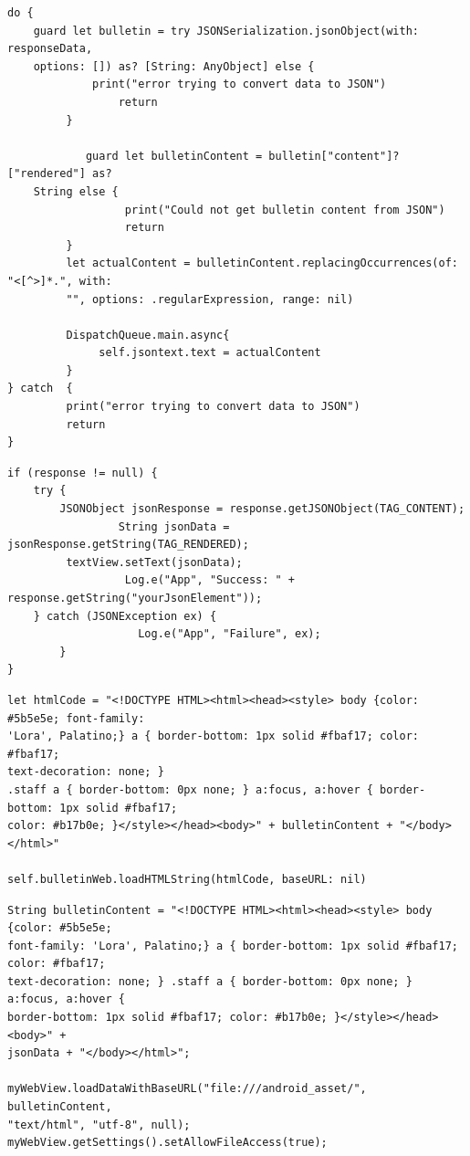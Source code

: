 \documentclass[letterpaper,10pt,draftclsnofoot,onecolumn,titlepage]{IEEEtran}
\begin{document}
\begin{lstlisting}[caption=iOS JSON Parser]
 do {
 	guard let bulletin = try JSONSerialization.jsonObject(with: responseData,
	options: []) as? [String: AnyObject] else {
	         print("error trying to convert data to JSON")
                 return
         }

        	guard let bulletinContent = bulletin["content"]?["rendered"] as?
	String else {
                  print("Could not get bulletin content from JSON")
                  return
         }
         let actualContent = bulletinContent.replacingOccurrences(of: "<[^>]*.", with:
         "", options: .regularExpression, range: nil)

         DispatchQueue.main.async{
 	          self.jsontext.text = actualContent
         }
} catch  {
         print("error trying to convert data to JSON")
         return
}
\end{lstlisting}

\begin{lstlisting}[caption=Android JSON Parser]
if (response != null) {
	try {
		JSONObject jsonResponse = response.getJSONObject(TAG_CONTENT);
                 String jsonData = jsonResponse.getString(TAG_RENDERED);
		 textView.setText(jsonData);
                  Log.e("App", "Success: " + response.getString("yourJsonElement"));
	} catch (JSONException ex) {
                    Log.e("App", "Failure", ex);
        }
}
\end{lstlisting}

\begin{lstlisting}[caption=iOS Load into WebView]
let htmlCode = "<!DOCTYPE HTML><html><head><style> body {color: #5b5e5e; font-family:
'Lora', Palatino;} a { border-bottom: 1px solid #fbaf17; color: #fbaf17;
text-decoration: none; }
.staff a { border-bottom: 0px none; } a:focus, a:hover { border-bottom: 1px solid #fbaf17;
color: #b17b0e; }</style></head><body>" + bulletinContent + "</body></html>"

self.bulletinWeb.loadHTMLString(htmlCode, baseURL: nil)
		\end{lstlisting}

\begin{lstlisting}[caption=Android Load into WebView]
String bulletinContent = "<!DOCTYPE HTML><html><head><style> body {color: #5b5e5e;
font-family: 'Lora', Palatino;} a { border-bottom: 1px solid #fbaf17; color: #fbaf17;
text-decoration: none; } .staff a { border-bottom: 0px none; } a:focus, a:hover {
border-bottom: 1px solid #fbaf17; color: #b17b0e; }</style></head><body>" +
jsonData + "</body></html>";

myWebView.loadDataWithBaseURL("file:///android_asset/", bulletinContent,
"text/html", "utf-8", null);
myWebView.getSettings().setAllowFileAccess(true);
\end{lstlisting}
\end{document}
